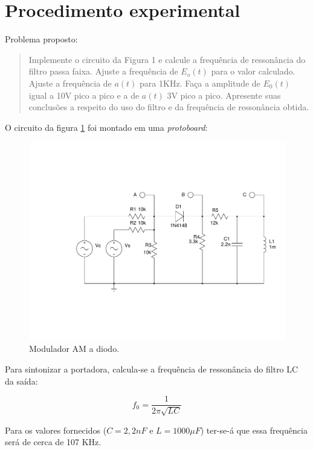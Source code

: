 \documentclass[]{report}
\begin{document}
\section{Procedimento experimental}

Problema proposto:
\begin{quote}
Implemente o circuito da Figura 1 e calcule a frequência de ressonância do filtro passa faixa. Ajuste a frequência de $E_o(t)$ para o valor calculado. Ajuste a frequência de $a(t)$ para 1KHz. Faça a amplitude de $E_0(t)$ igual a 10V pico a pico e a de $a(t)$ 3V pico a pico. Apresente suas conclusões a respeito do uso do filtro e da frequência de ressonância obtida.
\end{quote}


O circuito da figura \ref{fig:demodulador_AM_diodo} foi montado em uma \textit{protoboard}:
\begin{figure}[H]
\begin{center}
\includegraphics[scale=0.4,clip]{./imagens/AM_Modulator_Diode}
\end{center}
\caption{Modulador AM a diodo.}
\label{fig:demodulador_AM_diodo}
\end{figure}

Para sintonizar a portadora, calcula-se a frequência de ressonância do filtro LC da saída:

\begin{equation}
f_0 = \frac{1}{2 \pi \sqrt{LC}}
\end{equation}

Para os valores fornecidos ($C = 2,2 nF$ e $L = 1000 \mu F$) ter-se-á que essa frequência será de cerca de 107 KHz. 
\end{document}

